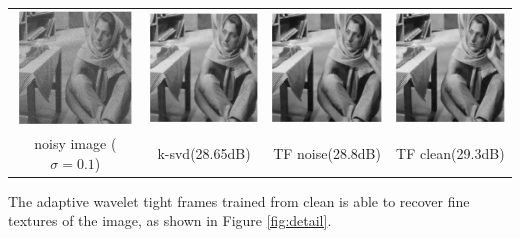 \documentclass[a4paper]{article}
\begin{document}
\begin{center}
\label{fig:bar}
\begin{tabular}{c c c c}
\includegraphics[width=3cm]{./figures/4_1_noise.eps} & \includegraphics[width=3cm]{./figures/4_3_ksvd.eps}
&\includegraphics[width=3cm]{./figures/4_4_tfnoise.eps} & \includegraphics[width=3cm]{./figures/4_5_tfclean.eps}\\
 noisy image ($\sigma=0.1$)& k-svd(28.65dB) &TF noise(28.8dB) & TF clean(29.3dB) 
\end{tabular}
\end{center}
The adaptive wavelet tight frames trained from clean is able to recover fine textures of the image, as shown in Figure \ref{fig:detail}.
\end{document}
